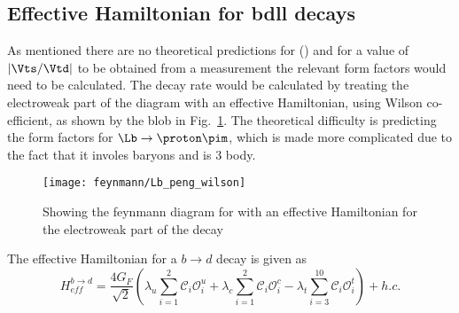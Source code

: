 \subsection{Effective Hamiltonian for b\to dll decays} %
As mentioned there are no theoretical predictions for \BF(\Lbpi) and for a value of $|\Vts/\Vtd|$ to be obtained from a measurement the relevant form factors would need to be calculated. The decay rate would be calculated by treating the electroweak part of the diagram with an effective Hamiltonian, using Wilson co-efficient, as shown by the blob in Fig.~\ref{fig:wilson}. The theoretical difficulty is predicting the form factors for $\Lb\to\proton\pim$, which is made more complicated due to the fact that it involes baryons and is 3 body.
\begin{figure}[h!]
  \centering
  \texttt{[image: feynmann/Lb\_peng\_wilson]}
  \caption{Showing the feynmann diagram for \Lbpi with an effective Hamiltonian for the electroweak part of the decay~\cite{lowrecoil}}
  \label{fig:wilson}
    \end{figure}
The effective Hamiltonian for a $b\to d$ decay is given as
\begin{equation}
H^{b\to d}_{eff} = \frac{4G_{F}}{\sqrt{2}}(\lambda_{u}\sum^{2}_{i=1}\mathcal{C}_{i}\mathcal{O}^{u}_{i} + \lambda_{c}\sum^{2}_{i=1}\mathcal{C}_{i}\mathcal{O}^{c}_{i} - \lambda_{t}\sum^{10}_{i=3}\mathcal{C}_{i}\mathcal{O}^{t}_{i}) + h.c.
\end{equation}

